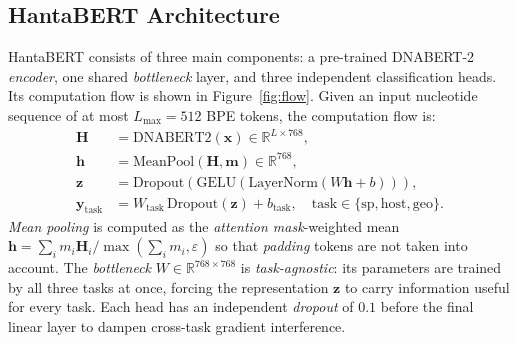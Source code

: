 \documentclass[conference]{IEEEtran}
\begin{document}
\subsection{HantaBERT Architecture}

HantaBERT consists of three main components: a pre-trained DNABERT-2
\emph{encoder}, one shared \emph{bottleneck} layer, and three independent
classification heads. Its computation flow is shown in
Figure~\ref{fig:flow}. Given an input nucleotide sequence of at most
$L_{\max}=512$ BPE tokens, the computation flow is:
\[
\begin{aligned}
\mathbf{H} &= \text{DNABERT2}(\mathbf{x}) \in \mathbb{R}^{L \times 768}, \\
\mathbf{h} &= \text{MeanPool}(\mathbf{H}, \mathbf{m}) \in \mathbb{R}^{768}, \\
\mathbf{z} &= \text{Dropout}(\text{GELU}(\text{LayerNorm}(W\mathbf{h}\!+\!b))), \\
\mathbf{y}_{\text{task}} &= W_{\text{task}}\,\text{Dropout}(\mathbf{z}) + b_{\text{task}},
\quad \text{task} \in \{\text{sp},\text{host},\text{geo}\}.
\end{aligned}
\]
\emph{Mean pooling} is computed as the \emph{attention mask}-weighted mean
\(
\mathbf{h} = \sum_i m_i \mathbf{H}_i / \max(\sum_i m_i, \varepsilon)
\)
so that \emph{padding} tokens are not taken into account. The
\emph{bottleneck} $W \in \mathbb{R}^{768\times 768}$ is
\emph{task-agnostic}: its parameters are trained by all three tasks at
once, forcing the representation $\mathbf{z}$ to carry information useful
for every task. Each head has an independent \emph{dropout} of $0{.}1$
before the final linear layer to dampen cross-task gradient interference.
\end{document}
